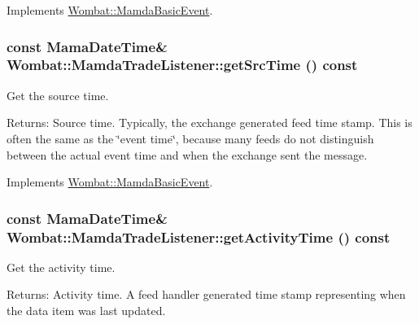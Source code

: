 Implements \hyperlink{classWombat_1_1MamdaBasicEvent_94e531c6ae9ae7798725db14facbd6e2}{Wombat::Mamda\-Basic\-Event}.\hypertarget{classWombat_1_1MamdaTradeListener_913b0f0e63ffde58f3f01a11d551bc9c}{
\subsubsection[getSrcTime]{\setlength{\rightskip}{0pt plus 5cm}const Mama\-Date\-Time\& Wombat::Mamda\-Trade\-Listener::get\-Src\-Time () const}}
\label{classWombat_1_1MamdaTradeListener_913b0f0e63ffde58f3f01a11d551bc9c}


Get the source time. 

\begin{Desc}
\item[Returns:]Source time. Typically, the exchange generated feed time stamp. This is often the same as the \char`\"{}event time\char`\"{}, because many feeds do not distinguish between the actual event time and when the exchange sent the message. \end{Desc}


Implements \hyperlink{classWombat_1_1MamdaBasicEvent_60b5d51f3799c4762090505ef5b213e9}{Wombat::Mamda\-Basic\-Event}.\hypertarget{classWombat_1_1MamdaTradeListener_6262a8a8952d505d580832d5f7bec078}{
\subsubsection[getActivityTime]{\setlength{\rightskip}{0pt plus 5cm}const Mama\-Date\-Time\& Wombat::Mamda\-Trade\-Listener::get\-Activity\-Time () const}}
\label{classWombat_1_1MamdaTradeListener_6262a8a8952d505d580832d5f7bec078}


Get the activity time. 

\begin{Desc}
\item[Returns:]Activity time. A feed handler generated time stamp representing when the data item was last updated. \end{Desc}


